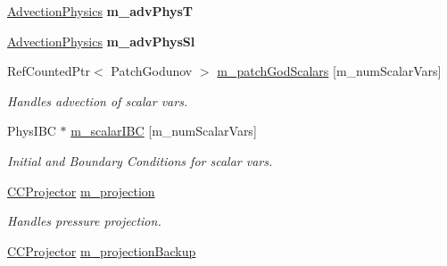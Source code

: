 \begin{DoxyCompactItemize}
\item 
\hypertarget{class_a_m_r_level_mushy_layer_aeed83b5ab64ca1c98478753602ebbd40}{\hyperlink{class_advection_physics}{Advection\-Physics} {\bfseries m\-\_\-adv\-Phys\-T}}\label{class_a_m_r_level_mushy_layer_aeed83b5ab64ca1c98478753602ebbd40}

\item 
\hypertarget{class_a_m_r_level_mushy_layer_a6f0d3470a6089238d42a6eb3a2222142}{\hyperlink{class_advection_physics}{Advection\-Physics} {\bfseries m\-\_\-adv\-Phys\-Sl}}\label{class_a_m_r_level_mushy_layer_a6f0d3470a6089238d42a6eb3a2222142}

\item 
\hypertarget{class_a_m_r_level_mushy_layer_a624292a7c8fa00de496a75a9816d8f29}{Ref\-Counted\-Ptr$<$ Patch\-Godunov $>$ \hyperlink{class_a_m_r_level_mushy_layer_a624292a7c8fa00de496a75a9816d8f29}{m\-\_\-patch\-God\-Scalars} \mbox{[}m\-\_\-num\-Scalar\-Vars\mbox{]}}\label{class_a_m_r_level_mushy_layer_a624292a7c8fa00de496a75a9816d8f29}

\begin{DoxyCompactList}\small\item\em Handles advection of scalar vars. \end{DoxyCompactList}\item 
\hypertarget{class_a_m_r_level_mushy_layer_aff6179584bf6eaa3c6c016f03e23ba48}{Phys\-I\-B\-C $\ast$ \hyperlink{class_a_m_r_level_mushy_layer_aff6179584bf6eaa3c6c016f03e23ba48}{m\-\_\-scalar\-I\-B\-C} \mbox{[}m\-\_\-num\-Scalar\-Vars\mbox{]}}\label{class_a_m_r_level_mushy_layer_aff6179584bf6eaa3c6c016f03e23ba48}

\begin{DoxyCompactList}\small\item\em Initial and Boundary Conditions for scalar vars. \end{DoxyCompactList}\item 
\hypertarget{class_a_m_r_level_mushy_layer_a72b78b19e03f6c997c1cccf97dd20790}{\hyperlink{class_c_c_projector}{C\-C\-Projector} \hyperlink{class_a_m_r_level_mushy_layer_a72b78b19e03f6c997c1cccf97dd20790}{m\-\_\-projection}}\label{class_a_m_r_level_mushy_layer_a72b78b19e03f6c997c1cccf97dd20790}

\begin{DoxyCompactList}\small\item\em Handles pressure projection. \end{DoxyCompactList}\item 
\hypertarget{class_a_m_r_level_mushy_layer_a074c89f375f2e2436f0e9ab4b8846ad1}{\hyperlink{class_c_c_projector}{C\-C\-Projector} \hyperlink{class_a_m_r_level_mushy_layer_a074c89f375f2e2436f0e9ab4b8846ad1}{m\-\_\-projection\-Backup}}\label{class_a_m_r_level_mushy_layer_a074c89f375f2e2436f0e9ab4b8846ad1}


\end{DoxyCompactItemize}
